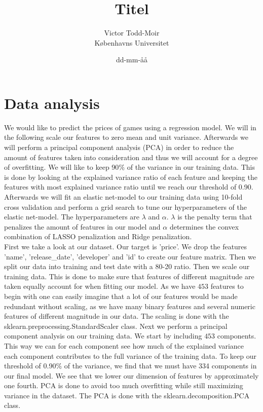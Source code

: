 \documentclass[12pt,a4paper]{article}
\author{Victor Todd-Moir\\Københavns Universitet}
\date{dd-mm-åå}
\title{Titel}
\begin{document}
	\maketitle
\section*{Data analysis}
We would like to predict the prices of games using a regression model. We will in the following scale our features to zero mean and unit variance. Afterwards we will perform a principal component analysis (PCA) in order to reduce the amount of features taken into consideration and thus we will account for a degree of overfitting. We will like to keep 90$\text{\%}$ of the variance in our training data. This is done by looking at the explained variance ratio of each feature and keeping the features with most explained variance ratio until we reach our threshold of 0.90. Afterwards we will fit an elastic net-model to our training data using 10-fold cross validation and perform a grid search to tune our hyperparameters of the elastic net-model. The hyperparameters are $\lambda$ and $\alpha$. $\lambda$ is the penalty term that penalizes the amount of features in our model and $\alpha$ determines the convex combination of LASSO penalization and Ridge penalization.\\
First we take a look at our dataset. Our target is 'price'. We drop the features 'name', 'release\_date', 'developer' and 'id' to create our feature matrix. Then we split our data into training and test date with a 80-20 ratio. Then we scale our training data. This is done to make sure that features of different magnitude are taken equally account for when fitting our model. As we have $453$ features to begin with one can easily imagine that a lot of our features would be made redundant without scaling, as we have many binary features and several numeric features of different magnitude in our data. The scaling is done with the sklearn.preprocessing.StandardScaler class. Next we perform a principal component analysis on our training data. We start by including $453$ components. This way we can for each component see how much of the explained variance each component contributes to the full variance of the training data. To keep our threshold of 0.90\% of the variance, we find that we must have 334 components in our final model. We see that we lower our dimension of features by approximately one fourth. PCA is done to avoid too much overfitting while still maximizing variance in the dataset. The PCA is done with the sklearn.decomposition.PCA class.\\
\end{document}
